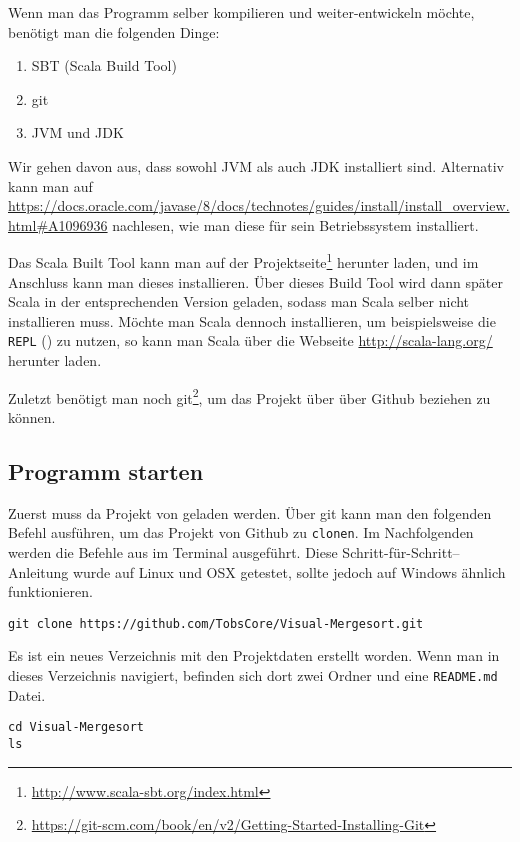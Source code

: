 Wenn man das Programm selber kompilieren und weiter-entwickeln möchte, benötigt man die folgenden Dinge:

\begin{enumerate}
\item SBT (Scala Build Tool)
\item git
\item JVM und JDK
\end{enumerate}

Wir gehen davon aus, dass sowohl JVM als auch JDK installiert sind. Alternativ kann man auf \url{https://docs.oracle.com/javase/8/docs/technotes/guides/install/install_overview.html#A1096936} nachlesen, wie man diese für sein Betriebssystem installiert.

Das Scala Built Tool kann man auf der Projektseite\footnote{\url{http://www.scala-sbt.org/index.html}} herunter laden, und im Anschluss kann man dieses installieren. Über dieses Build Tool wird dann später Scala in der entsprechenden Version geladen, sodass man Scala selber nicht installieren muss. Möchte man Scala dennoch installieren, um beispielsweise die \texttt{REPL} (\cite{GettingStartedWithTheScalaREPL}) zu nutzen, so kann man Scala über die Webseite \url{http://scala-lang.org/} herunter laden.

Zuletzt benötigt man noch git\footnote{\url{https://git-scm.com/book/en/v2/Getting-Started-Installing-Git}}, um das Projekt über über Github beziehen zu können.

\subsection{Programm starten}

Zuerst muss da Projekt von geladen werden. Über git kann man den folgenden Befehl ausführen, um das Projekt von Github zu \texttt{clonen}. Im Nachfolgenden werden die Befehle aus im Terminal ausgeführt. Diese Schritt-für-Schritt--Anleitung wurde auf Linux und OSX getestet, sollte jedoch auf Windows ähnlich funktionieren.

\begin{verbatim}
git clone https://github.com/TobsCore/Visual-Mergesort.git
\end{verbatim}

Es ist ein neues Verzeichnis mit den Projektdaten erstellt worden. Wenn man in dieses Verzeichnis navigiert, befinden sich dort zwei Ordner und eine \texttt{README.md} Datei.

\begin{verbatim}
cd Visual-Mergesort
ls
\end{verbatim}

